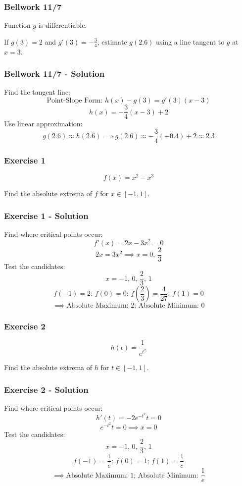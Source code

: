 \documentclass[12pt]{beamer}
\begin{document}
\begin{frame}
	\frametitle{Bellwork 11/7}
	\initclock

	\vfill
	\vfill
	\vfill
	\vfill
	\vfill
	\large
	Function $g$ is differentiable.\par
	\vfill
	If $g(3)=2$ and $g'(3)=-\frac{3}{4}$, estimate $g(2.6)$ using a line tangent to $g$ at $x=3$.\par
	\vfill
	\vfill
	\vfill
	\vfill
	\vfill

	\small
	\crono
\end{frame}
\begin{frame}
	\frametitle{Bellwork 11/7 - Solution}

	Find the tangent line:
	\[\text{Point-Slope Form: }h(x)-g(3)=g'(3)(x-3)\]
	\[h(x)=-\frac{3}{4}(x-3)+2\]
	Use linear approximation:
	\[g(2.6)\approx h(2.6)\implies \boxed{g(2.6)\approx -\frac{3}{4}(-0.4)+2\approx 2.3}\]
\end{frame}
\begin{frame}
	\frametitle{Exercise 1}

	\vfill
	\vfill
	\vfill
	\vfill
	\Large
	\[f(x)=x^2-x^3\]
	\vfill
	\large
	\begin{center}
		Find the absolute extrema of $f$ for $x\in [-1,1]$.
	\end{center}
	\vfill
	\vfill
	\vfill
	\vfill
\end{frame}
\begin{frame}
	\frametitle{Exercise 1 - Solution}

	Find where critical points occur:
	\[f'(x)=2x-3x^2=0\]
	\[2x=3x^2\implies x=0\text{, }\frac{2}{3}\]
	Test the candidates:
	\[x=-1\text{, }0\text{, }\frac{2}{3}\text{, }1\]
	\[f(-1)=2\text{; }f(0)=0\text{; }f\left(\frac{2}{3}\right)=\frac{4}{27}\text{; }f(1)=0\]
	\[\implies \boxed{\text{Absolute Maximum: }2\text{; }\text{Absolute Minimum: }0}\]
\end{frame}
\begin{frame}
	\frametitle{Exercise 2}

	\vfill
	\vfill
	\vfill
	\vfill
	\Large
	\[h(t)=\frac{1}{e^{t^2}}\]
	\vfill
	\large
	\begin{center}
		Find the absolute extrema of $h$ for $t\in [-1,1]$.
	\end{center}
	\vfill
	\vfill
	\vfill
	\vfill
\end{frame}
\begin{frame}
	\frametitle{Exercise 2 - Solution}

	Find where critical points occur:
	\[h'(t)=-2e^{-t^2}t=0\]
	\[e^{-t^2}t=0\implies x=0\]
	Test the candidates:
	\[x=-1\text{, }0\text{, }\frac{2}{3}\text{, }1\]
	\[f(-1)=\frac{1}{e}\text{; }f(0)=1\text{; }f(1)=\frac{1}{e}\]
	\[\implies \boxed{\text{Absolute Maximum: }1\text{; }\text{Absolute Minimum: }\frac{1}{e}}\]
\end{frame}
\end{document}
